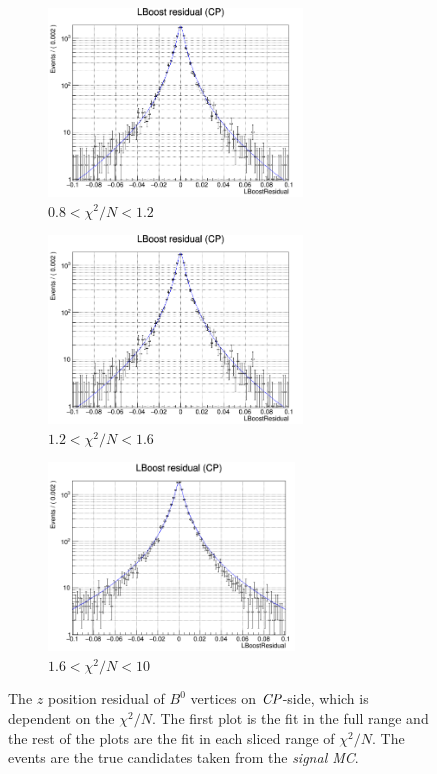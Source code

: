 \begin{figure}[htbp]
\begin{subfigure}{0.5\linewidth}
	\end{subfigure}
	\begin{subfigure}{0.5\linewidth}
		\caption{$0.8<\chi^2/N<1.2$}
		\includegraphics[height=5cm]{figures/residual0.8_1.2}
	\end{subfigure}
	
	\begin{subfigure}{0.5\linewidth}
		\caption{$1.2<\chi^2/N<1.6$}
		\includegraphics[height=5cm]{figures/residual1.2_1.6}
	\end{subfigure}
	\begin{subfigure}{0.5\linewidth}
		\caption{$1.6<\chi^2/N<10$}
		\includegraphics[height=5cm]{figures/residual1.6_10}
	\end{subfigure}
	\caption{ The $z$ position residual of $B^0$ vertices on $\it{CP}$-side, which is dependent on the $\chi^2/N$. The first plot is the fit in the full range and the rest of the plots are the fit in each sliced range of $\chi^2/N$. The events are the true candidates taken from the \textit{signal MC}.}
	\label{fig:redchi2fit}
\end{figure}
